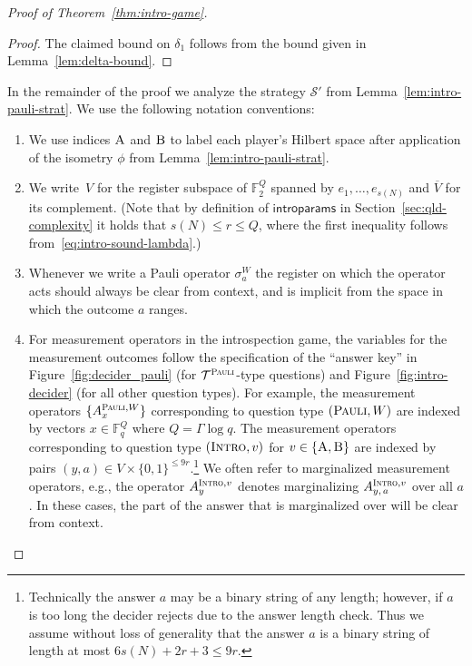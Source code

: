 \documentclass[11pt]{article}
\theoremstyle{definition}
\newcommand{\F}{\ensuremath{\mathbb{F}}}
\newcommand{\strategy}{\mathscr{S}}
\newcommand{\type}{\mathcal{T}}
\newcommand{\labelstyle}[1]{\ensuremath{\textsc{#1}}\xspace}
\newcommand{\trole}{\ensuremath{v}} %
\newcommand{\alice}{\labelstyle{A}}
\newcommand{\bob}{\labelstyle{B}}
\newcommand{\typestyle}[1]{\ensuremath{\textsc{#1}}\xspace}
\newcommand{\Pauli}{\typestyle{Pauli}}
\newcommand{\Intro}{\typestyle{Intro}}
\newcommand{\AB}{\{\alice, \bob\}}
\newcommand{\introparams}{\mathsf{introparams}}
\begin{document}
\begin{proof}[Proof of Theorem~\ref{thm:intro-game}]
\begin{proof}
    The claimed bound on $\delta_1$ follows from the bound given in
    Lemma~\ref{lem:delta-bound}.
  \end{proof}
	
  In the remainder of the proof we analyze the strategy $\strategy'$ from
  Lemma~\ref{lem:intro-pauli-strat}.
  We use the following notation conventions:
  \begin{enumerate}
  \item %
    We use indices $\alice$ and $\bob$ to label each player's Hilbert space
    after application of the isometry $\phi$ from
    Lemma~\ref{lem:intro-pauli-strat}.

  \item We write~$V$ for the register subspace of $\F_2^{Q}$ spanned by $e_1,
    \ldots, e_{s(N)}$ and $\overline{V}$ for its complement.
    (Note that by definition of $\introparams$ in
    Section~\ref{sec:qld-complexity} it holds that $s(N)\leq r \leq Q$, where
    the first inequality follows from~\eqref{eq:intro-sound-lambda}.)

  \item Whenever we write a Pauli operator $\sigma^W_a$ the register on which
    the operator acts should always be clear from context, and is implicit from
    the space in which the outcome $a$ ranges.
  
  \item For measurement operators in the introspection game, the variables for
    the measurement outcomes follow the specification of the ``answer key'' in
    Figure~\ref{fig:decider_pauli} (for $\type^\Pauli$-type questions) and
    Figure~\ref{fig:intro-decider} (for all other question types).
    For example, the measurement operators $\{A_x^{\Pauli,W} \}$ corresponding
    to question type $(\Pauli,W)$ are indexed by vectors $x \in \F_q^Q$ where $Q
    = \Gamma \log q$.
    The measurement operators corresponding to question type $(\Intro,\trole)$
    for $\trole \in \AB$ are indexed by pairs $(y,a) \in V \times \{0,1\}^{\leq
      9r}$.\footnote{Technically the answer $a$ may be a binary string of any
      length; however, if $a$ is too long the decider rejects due to the answer
      length check.
      Thus we assume without loss of generality that the answer $a$ is a binary
      string of length at most $6s(N) + 2r + 3 \leq 9r$.}
    We often refer to marginalized measurement operators, e.g., the operator
    $A^{\Intro,\trole}_{y}$ denotes marginalizing $A^{\Intro,\trole}_{y,\, a}$ over
    all $a$.
    In these cases, the part of the answer that is marginalized over will be
    clear from context.
		

\end{enumerate}
\end{proof}
\end{document}
